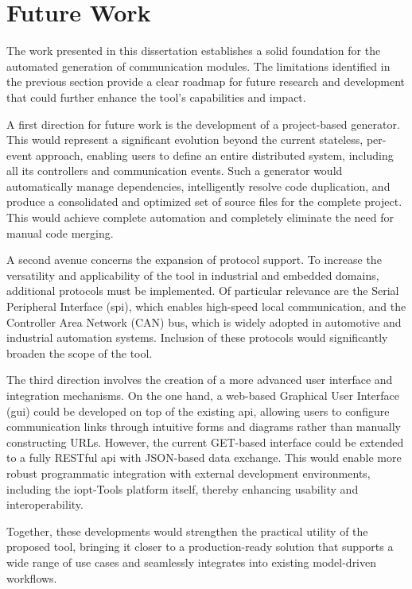 \section{Future Work}
\label{sec:future_work}

The work presented in this dissertation establishes a solid foundation for the automated generation of communication modules. The limitations identified in the previous section provide a clear roadmap for future research and development that could further enhance the tool's capabilities and impact. 

A first direction for future work is the development of a project-based generator. This would represent a significant evolution beyond the current stateless, per-event approach, enabling users to define an entire distributed system, including all its controllers and communication events. Such a generator would automatically manage dependencies, intelligently resolve code duplication, and produce a consolidated and optimized set of source files for the complete project. This would achieve complete automation and completely eliminate the need for manual code merging.

A second avenue concerns the expansion of protocol support. To increase the versatility and applicability of the tool in industrial and embedded domains, additional protocols must be implemented. Of particular relevance are the Serial Peripheral Interface (\gls{spi}), which enables high-speed local communication, and the Controller Area Network (CAN) bus, which is widely adopted in automotive and industrial automation systems. Inclusion of these protocols would significantly broaden the scope of the tool.

The third direction involves the creation of a more advanced user interface and integration mechanisms. On the one hand, a web-based Graphical User Interface (\gls{gui}) could be developed on top of the existing \gls{api}, allowing users to configure communication links through intuitive forms and diagrams rather than manually constructing URLs. However, the current GET-based interface could be extended to a fully RESTful \gls{api} with JSON-based data exchange. This would enable more robust programmatic integration with external development environments, including the \gls{iopt}-Tools platform itself, thereby enhancing usability and interoperability.

Together, these developments would strengthen the practical utility of the proposed tool, bringing it closer to a production-ready solution that supports a wide range of use cases and seamlessly integrates into existing model-driven workflows.

